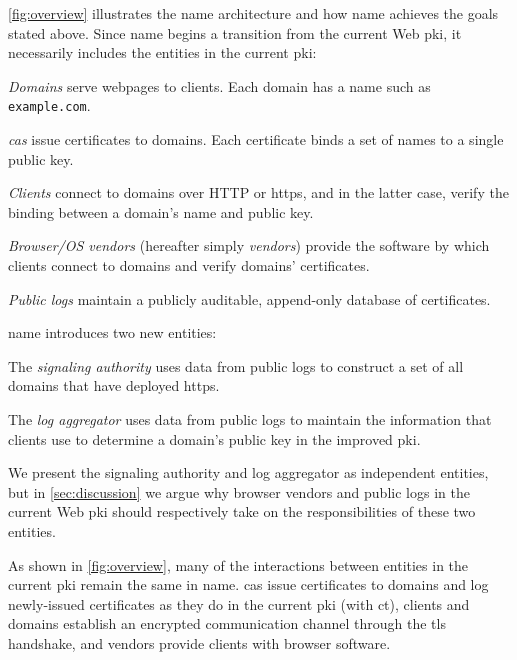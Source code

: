 \autoref{fig:overview} illustrates the \ac{name} architecture and how \ac{name}
achieves the goals stated above. Since \ac{name} begins a transition from the
current Web \ac{pki}, it necessarily includes the entities in the current
\ac{pki}:
\begin{compactitem}
\item \emph{Domains} serve webpages to clients. Each domain has a name such as
  \texttt{example.com}. 
\item \emph{\acp{ca}} issue certificates to domains. Each certificate binds a
  set of names to a single public key.
\item \emph{Clients} connect to domains over HTTP or \ac{https}, and in the
  latter case, verify the binding between a domain's name and public key.
\item \emph{Browser/OS vendors} (hereafter simply \emph{vendors}) provide the
  software by which clients connect to domains and verify domains' certificates.
\item \emph{Public logs} maintain a publicly auditable, append-only database of
  certificates.
\end{compactitem}
\ac{name} introduces two new entities:
\begin{compactitem}
\item The \emph{signaling authority} uses data from public logs to construct a
  set of all domains that have deployed \ac{https}.
\item The \emph{log aggregator} uses data from public logs to maintain the
  information that clients use to determine a domain's public key in the
  improved \ac{pki}.
\end{compactitem}
We present the signaling authority and log aggregator as independent entities,
but in \autoref{sec:discussion} we argue why browser vendors and public logs in
the current Web \ac{pki} should respectively take on the responsibilities of
these two entities.

As shown in \autoref{fig:overview}, many of the interactions between entities in
the current \ac{pki} remain the same in \ac{name}. \acp{ca} issue certificates
to domains and log newly-issued certificates as they do in the current \ac{pki}
(with \ac{ct}), clients and domains establish an encrypted communication channel
through the \ac{tls} handshake, and vendors provide clients with browser
software.

